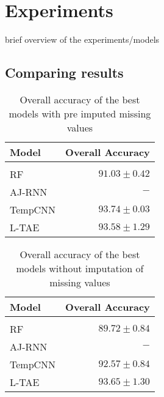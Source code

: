 \section{Experiments}
brief overview of the experiments/models


\pagebreak

\pagebreak

\pagebreak

\pagebreak


\subsection{Comparing results}

\begin{table}[!htbp]
  \centering
    \begin{tabular}{lr}
    Model                       & Overall Accuracy             \\[0.2cm] 
    \hline \\[-0.2cm]
    RF      & $91.03 \pm 0.42$\\
    AJ-RNN & $-$\\
    TempCNN & $93.74 \pm 0.03$\\
    L-TAE   & $93.58 \pm 1.29$
    \end{tabular}
  \caption{Overall accuracy of the best models with pre imputed missing values} 
\end{table}

\begin{table}[!htbp]
  \centering
    \begin{tabular}{lr}
    Model                       & Overall Accuracy             \\[0.2cm] 
    \hline \\[-0.2cm]
    RF      & $89.72 \pm 0.84$\\
    AJ-RNN & $-$\\
    TempCNN & $92.57 \pm 0.84$\\
    L-TAE   & $93.65 \pm 1.30$
    \end{tabular}
  \caption{Overall accuracy of the best models without imputation of missing values} 
\end{table}